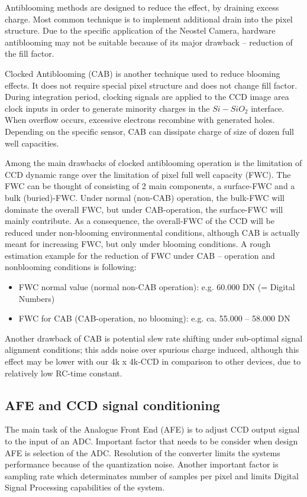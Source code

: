 Antiblooming methods are designed to reduce the effect, by draining excess charge. Most common technique is to implement additional drain into the pixel structure. Due to the specific application of the Neostel Camera, hardware antiblooming may not be suitable because of its major drawback -- reduction of the fill factor.

Clocked Antiblooming (CAB) is another technique used to reduce blooming effects. It does not require special pixel structure and does not change fill factor. During integration period, clocking signals are applied to the CCD image area clock inputs in order to generate minority charges in the $Si-SiO_{2}$ interface. When overflow occurs, excessive electrons recombine with generated holes. Depending on the specific sensor, CAB can dissipate charge of size of dozen full well capacities.  

Among the main drawbacks of clocked antiblooming operation is the limitation of CCD dynamic
range over the limitation of pixel full well capacity (FWC). The FWC can be thought of consisting of 2
main components, a surface-FWC and a bulk (buried)-FWC. Under normal (non-CAB) operation, the
bulk-FWC will dominate the overall FWC, but under CAB-operation, the surface-FWC will mainly
contribute.
As a consequence, the overall-FWC of the CCD will be reduced under non-blooming environmental
conditions, although CAB is actually meant for increasing FWC, but only under blooming conditions.
A rough estimation example for the reduction of FWC under CAB – operation and nonblooming conditions is following:

\begin{itemize}
\item FWC normal value (normal non-CAB operation): e.g. 60.000 DN (= Digital Numbers)
\item FWC for CAB (CAB-operation, no blooming): e.g. ca. 55.000 – 58.000 DN
\end{itemize}


Another drawback of CAB is potential slew rate shifting under sub-optimal signal alignment
conditions; this adds noise over spurious charge induced, although this effect may be lower with our
4k x 4k-CCD in comparison to other devices, due to relatively low RC-time constant.

\subsection{AFE and CCD signal conditioning}

The main task of the Analogue Front End (AFE) is to adjust CCD output signal to the input of an ADC. Important factor that needs to be consider when design AFE is selection of the ADC. Resolution of the converter limits the systems performance because of the quantization noise. Another important factor is sampling rate which determinates number of samples per pixel and limits Digital Signal Processing capabilities of the system.

